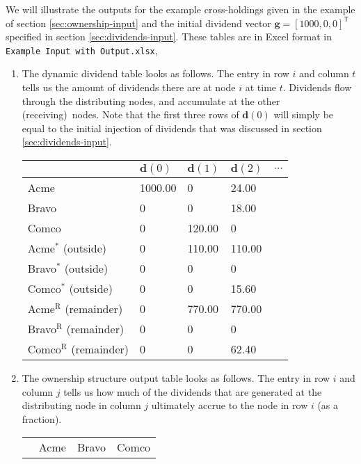 \documentclass[a4paper,12pt,reqno]{amsart}
\newcommand{\tr}{\mathsf{T}}
\theoremstyle{definition} \newtheorem{example}{Example}
\theoremstyle{definition} \newtheorem{condition}{Condition}
\theoremstyle{definition} \newtheorem{corollary}{Corollary}
\theoremstyle{definition} \newtheorem{claim}{Claim}
\theoremstyle{definition} \newtheorem{definition}{Definition}
\theoremstyle{definition} \newtheorem{conjecture}{Conjecture}
\theoremstyle{definition} \newtheorem{lemma}{Lemma}
\theoremstyle{definition} \newtheorem{theorem}{Theorem}
\theoremstyle{definition} \newtheorem*{theoremNoNumber}{Theorem}
\theoremstyle{definition} \newtheorem*{lemmaCorrespondence}{Lemma \ref{lem:correspondence}}
\theoremstyle{definition}\newtheorem{proposition}{Proposition}
\theoremstyle{definition} \newtheorem{result}{Result}
\theoremstyle{definition} \newtheorem*{definitionNoNumber}{Definition}
\theoremstyle{definition} \newtheorem{assumption}{Assumption}
\theoremstyle{definition} \newtheorem*{assumptionNoNumber}{Assumption}
\theoremstyle{definition} \newtheorem*{fact}{Fact}
\theoremstyle{definition} \newtheorem*{property}{Property}
\theoremstyle{definition} \newtheorem{remark}{Remark}
\begin{document}
We will illustrate the outputs for the example cross-holdings given in the  example of section  \ref{sec:ownership-input} and the initial dividend vector $\mathbf{g}=[1000,0,0]^\tr$ specified in section  \ref{sec:dividends-input}. These tables are in Excel format in {\tt Example Input with Output.xlsx},

\begin{enumerate}
\item The dynamic dividend table  looks as follows.
The entry in row $i$ and column $t$ tells us the amount of dividends there are at node $i$ at time $t$. Dividends flow through the distributing nodes, and accumulate at the other (receiving)\ nodes. Note that the first three rows of $\mathbf{d}(0)$ will simply be equal to the initial injection of dividends that was discussed in section \ref{sec:dividends-input}. \bigskip
\begin{center}
\begin{tabular}{lllll}
\toprule
 & $\mathbf{d}(0)$ & $\mathbf{d}(1)$ & $\mathbf{d}(2)$ & $\cdots$ \\
\midrule
Acme & 1000.00 & 0 & 24.00 &\\
Bravo & 0 & 0 & 18.00&\\
Comco & 0 & 120.00 & 0 & \\
\midrule
\midrule
Acme$^*$ (outside) & 0 & 110.00 & 110.00 & \\
Bravo$^*$ (outside)  & 0 & 0 & 0 & \\
Comco$^*$ (outside)  & 0 & 0 & 15.60 & \\
\midrule
\midrule
Acme$^\text{R}$ (remainder) & 0 & 770.00 & 770.00 & \\
Bravo$^\text{R}$ (remainder)  & 0 & 0 & 0 & \\
Comco$^\text{R}$ (remainder)  & 0 & 0 & 62.40& \\
\bottomrule
\end{tabular}
\end{center}

\bigskip

\item The ownership structure output table looks as follows.
The entry in row $i$ and column $j$ tells us how much of the dividends that are generated at the distributing node in column $j$ ultimately accrue to the node in row $i$ (as a fraction). \bigskip
\begin{center}
\begin{tabular}{llll}
\toprule
 & Acme & Bravo & Comco  \\


\end{tabular}
\end{center}
\end{enumerate}
\end{document}
